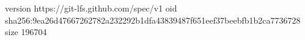 version https://git-lfs.github.com/spec/v1
oid sha256:9ea26d47667262782a232292b1dfa43839487f651eef37beebfb1b2ca7736728
size 196704
